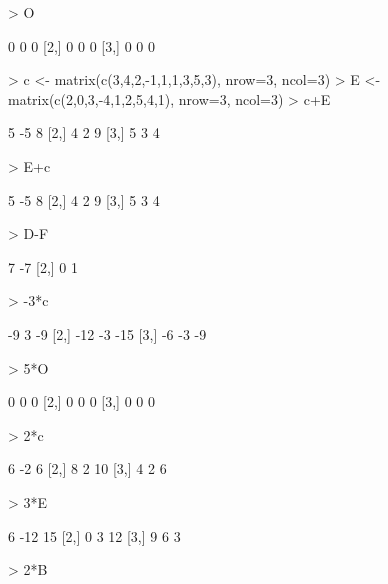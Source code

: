 \documentclass{article}
\begin{document}
\begin{Schunk}
\begin{Sinput}
> O
\end{Sinput}
\begin{Soutput}
     [,1] [,2] [,3]
[1,]    0    0    0
[2,]    0    0    0
[3,]    0    0    0
\end{Soutput}
\begin{Sinput}
> c <- matrix(c(3,4,2,-1,1,1,3,5,3), nrow=3, ncol=3)
> E <- matrix(c(2,0,3,-4,1,2,5,4,1), nrow=3, ncol=3)
> c+E
\end{Sinput}
\begin{Soutput}
     [,1] [,2] [,3]
[1,]    5   -5    8
[2,]    4    2    9
[3,]    5    3    4
\end{Soutput}
\begin{Sinput}
> E+c
\end{Sinput}
\begin{Soutput}
     [,1] [,2] [,3]
[1,]    5   -5    8
[2,]    4    2    9
[3,]    5    3    4
\end{Soutput}
\begin{Sinput}
> D-F
\end{Sinput}
\begin{Soutput}
     [,1] [,2]
[1,]    7   -7
[2,]    0    1
\end{Soutput}
\begin{Sinput}
> -3*c
\end{Sinput}
\begin{Soutput}
     [,1] [,2] [,3]
[1,]   -9    3   -9
[2,]  -12   -3  -15
[3,]   -6   -3   -9
\end{Soutput}
\begin{Sinput}
> 5*O
\end{Sinput}
\begin{Soutput}
     [,1] [,2] [,3]
[1,]    0    0    0
[2,]    0    0    0
[3,]    0    0    0
\end{Soutput}
\begin{Sinput}
> 2*c
\end{Sinput}
\begin{Soutput}
     [,1] [,2] [,3]
[1,]    6   -2    6
[2,]    8    2   10
[3,]    4    2    6
\end{Soutput}
\begin{Sinput}
> 3*E
\end{Sinput}
\begin{Soutput}
     [,1] [,2] [,3]
[1,]    6  -12   15
[2,]    0    3   12
[3,]    9    6    3
\end{Soutput}
\begin{Sinput}
> 2*B
\end{Sinput}
\begin{Soutput}

\end{Soutput}
\end{Schunk}
\end{document}
